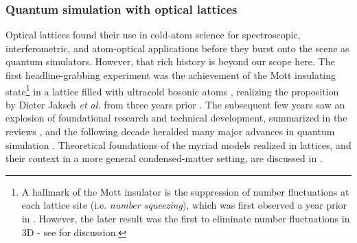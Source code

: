 

\subsubsection{Quantum simulation with optical lattices}

	Optical lattices found their use in cold-atom science for spectroscopic, interferometric, and atom-optical applications before they burst onto the scene as quantum simulators. However, that rich history is beyond our scope here. The first headline-grabbing experiment was the achievement of the Mott insulating state\footnote{A hallmark of the Mott insulator is the suppression of number fluctuations at each lattice site (i.e. \emph{number squeezing}), which was first observed a year prior in \cite{orzel01}. However, the later result was the first to eliminate number fluctuations in 3D - see \cite{morsch06} for discussion.} in a lattice filled with ultracold bosonic atoms \cite{greiner02}, realizing the proposition by Dieter Jaksch \emph{et al.} from three years prior \cite{jaksch98}.  The subsequent few years saw an explosion of foundational research and technical development, summarized in the reviews \cite{morsch06,bloch08}, and the following decade heralded many major advances in quantum simulation \cite{bloch12,gross17}. Theoretical foundations of the myriad models realized in lattices, and their context in a more general condensed-matter setting, are discussed in \cite{LewensteinLattices, lewenstein07}.

